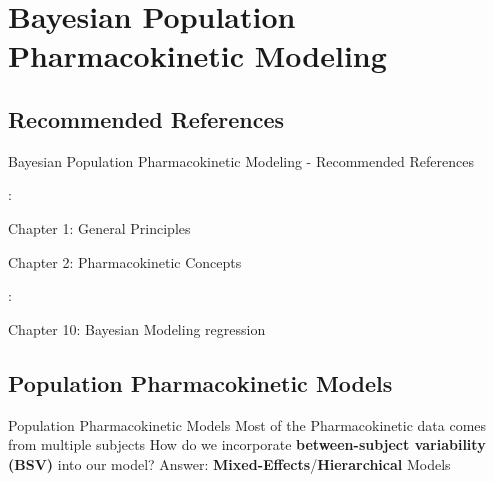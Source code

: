 \section{Bayesian Population Pharmacokinetic Modeling}

\subsection{Recommended References}
\begin{frame}{Bayesian Population Pharmacokinetic Modeling - Recommended References}
    \begin{vfilleditems}
        \item \textcite{Gabrielsson2006PKPDbook}:
        \begin{vfilleditems}
            \item Chapter 1: General Principles
            \item Chapter 2: Pharmacokinetic Concepts
        \end{vfilleditems}
        \item \textcite{Bonate2011PKPDbook}:
        \begin{vfilleditems}
            \item Chapter 10: Bayesian Modeling regression
        \end{vfilleditems}
        \item \textcite{margossian2022torsten}
    \end{vfilleditems}
\end{frame}

\subsection{Population Pharmacokinetic Models}
\begin{frame}{Population Pharmacokinetic Models}
    Most of the Pharmacokinetic data comes from multiple subjects
    \vfill
    How do we incorporate \textbf{between-subject variability (BSV)} into our model?
    \vfill
    Answer: \textbf{Mixed-Effects}/\textbf{Hierarchical} Models
\end{frame}